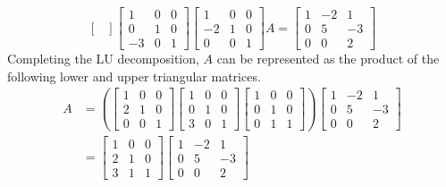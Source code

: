 \documentclass[../main.tex]{subfiles}
\begin{document}
\begin{solution}
\[\begin{bmatrix}
\end{bmatrix}
\begin{bmatrix}
    1  & 0 & 0 \\
    0  & 1 & 0 \\
    -3 & 0 & 1
\end{bmatrix}
\begin{bmatrix}
    1  & 0 & 0 \\
    -2 & 1 & 0 \\
    0  & 0 & 1
\end{bmatrix}
A =
\begin{bmatrix}
    1 & -2 & 1 \\
    0 & 5  & -3 \\
    0 & 0  & 2
\end{bmatrix}
\]
Completing the LU decomposition, $A$ can be represented as the
product of the following lower and upper triangular matrices.
\begin{align*}
    A
    &=
    \left(
    \begin{bmatrix}
        1 & 0 & 0 \\
        2 & 1 & 0 \\
        0 & 0 & 1
    \end{bmatrix}
    \begin{bmatrix}
        1 & 0 & 0 \\
        0 & 1 & 0 \\
        3 & 0 & 1
    \end{bmatrix}
    \begin{bmatrix}
        1 & 0 & 0 \\
        0 & 1 & 0 \\
        0 & 1 & 1
    \end{bmatrix}
    \right)
    \begin{bmatrix}
        1 & -2 & 1 \\
        0 & 5  & -3 \\
        0 & 0  & 2
    \end{bmatrix} \\
    &=
    \begin{bmatrix}
        1 & 0 & 0 \\
        2 & 1 & 0 \\
        3 & 1 & 1
    \end{bmatrix}
    \begin{bmatrix}
        1 & -2 & 1 \\
        0 & 5  & -3 \\
        0 & 0  & 2
    \end{bmatrix}

\end{align*}
\end{solution}
\end{document}
